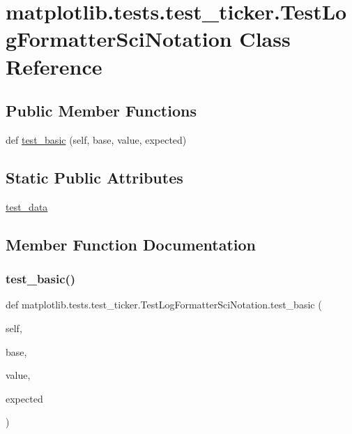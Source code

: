 \hypertarget{classmatplotlib_1_1tests_1_1test__ticker_1_1TestLogFormatterSciNotation}{}\section{matplotlib.\+tests.\+test\+\_\+ticker.\+Test\+Log\+Formatter\+Sci\+Notation Class Reference}
\label{classmatplotlib_1_1tests_1_1test__ticker_1_1TestLogFormatterSciNotation}
\subsection*{Public Member Functions}
\begin{DoxyCompactItemize}
\item 
def \hyperlink{classmatplotlib_1_1tests_1_1test__ticker_1_1TestLogFormatterSciNotation_a2fb487d8aabf0047c6c860f583aab353}{test\+\_\+basic} (self, base, value, expected)
\end{DoxyCompactItemize}
\subsection*{Static Public Attributes}
\begin{DoxyCompactItemize}
\item 
\hyperlink{classmatplotlib_1_1tests_1_1test__ticker_1_1TestLogFormatterSciNotation_a7a4a648f9bf9a4967a01b143112ca154}{test\+\_\+data}
\end{DoxyCompactItemize}


\subsection{Member Function Documentation}
\mbox{\label{classmatplotlib_1_1tests_1_1test__ticker_1_1TestLogFormatterSciNotation_a2fb487d8aabf0047c6c860f583aab353}} 
\subsubsection{\texorpdfstring{test\+\_\+basic()}{test\_basic()}}
{\footnotesize\ttfamily def matplotlib.\+tests.\+test\+\_\+ticker.\+Test\+Log\+Formatter\+Sci\+Notation.\+test\+\_\+basic (\begin{DoxyParamCaption}\item[{}]{self,  }\item[{}]{base,  }\item[{}]{value,  }\item[{}]{expected }\end{DoxyParamCaption})}



